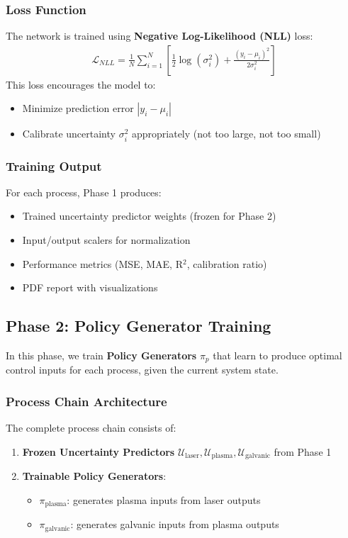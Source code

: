 \documentclass[11pt,a4paper]{article}
\begin{document}
\subsubsection{Loss Function}
The network is trained using \textbf{Negative Log-Likelihood (NLL)} loss:
\begin{align}
\mathcal{L}_{NLL} = \frac{1}{N} \sum_{i=1}^{N} \left[ \frac{1}{2}\log(\sigma_i^2) + \frac{(y_i - \mu_i)^2}{2\sigma_i^2} \right]
\end{align}
This loss encourages the model to:
\begin{itemize}
    \item Minimize prediction error $|y_i - \mu_i|$
    \item Calibrate uncertainty $\sigma_i^2$ appropriately (not too large, not too small)
\end{itemize}

\subsubsection{Training Output}
For each process, Phase 1 produces:
\begin{itemize}
    \item Trained uncertainty predictor weights (frozen for Phase 2)
    \item Input/output scalers for normalization
    \item Performance metrics (MSE, MAE, R$^2$, calibration ratio)
    \item PDF report with visualizations
\end{itemize}

\subsection{Phase 2: Policy Generator Training}

In this phase, we train \textbf{Policy Generators} $\pi_p$ that learn to produce optimal control inputs for each process, given the current system state.

\subsubsection{Process Chain Architecture}
The complete process chain consists of:
\begin{enumerate}
    \item \textbf{Frozen Uncertainty Predictors} $\mathcal{U}_{\text{laser}}, \mathcal{U}_{\text{plasma}}, \mathcal{U}_{\text{galvanic}}$ from Phase 1
    \item \textbf{Trainable Policy Generators}:
    \begin{itemize}
        \item $\pi_{\text{plasma}}$: generates plasma inputs from laser outputs
        \item $\pi_{\text{galvanic}}$: generates galvanic inputs from plasma outputs
    \end{itemize}
\end{enumerate}
\end{document}
